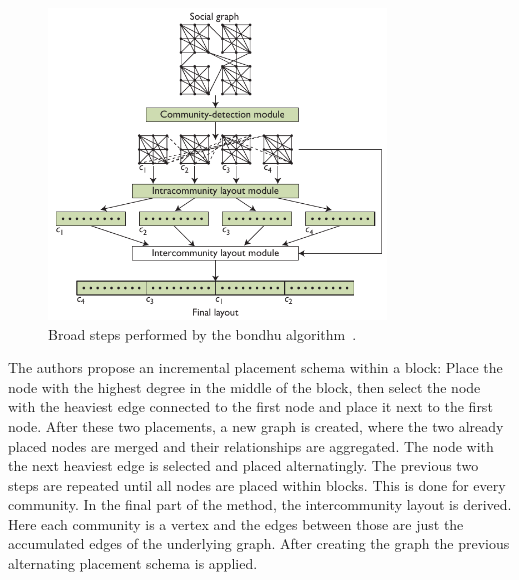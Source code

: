     \begin{figure}[htp]
        \begin{center}
            \includegraphics[keepaspectratio,width=0.8\textwidth]{img/06-rel_w/bondhu.png}
        \end{center}
        \caption{Broad steps performed by the bondhu algorithm~\autocite{hoque2012disk}.} 
        \label{bondhu-fig}
    \end{figure}

    The authors propose an incremental placement schema within a block:
    Place the node with the highest degree in the middle of the block, then select the node with the heaviest edge connected to the first node and place it next to the first node. 
    After these two placements, a new graph is created, where the two already placed nodes are merged and their relationships are aggregated. 
    The node with the next heaviest edge is selected and placed alternatingly. The previous two steps are repeated until all nodes are placed within blocks.
    This is done for every community.
    In the final part of the method, the intercommunity layout is derived. 
    Here each community is a vertex and the edges between those are just the accumulated edges of the underlying graph. 
    After creating the graph the previous alternating placement schema is applied.
